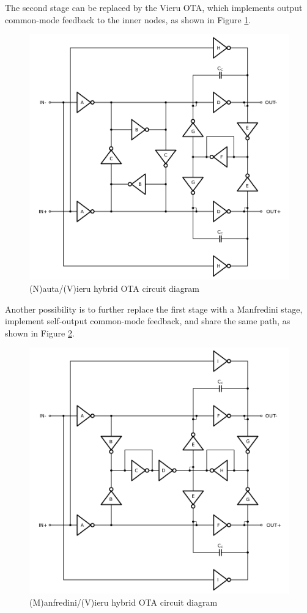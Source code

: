 \documentclass[conference]{IEEEtran}
\begin{document}
	The second stage can be replaced by the Vieru OTA, which implements output common-mode feedback to the inner nodes, as shown in Figure \ref{fig:nautavieru:sch}.
	
	\begin{figure}[!htbp]
		\centerline{\includegraphics[scale=0.50]{circuits/nautavieru.pdf}}
		\caption{(N)auta/(V)ieru hybrid OTA circuit diagram}
		\label{fig:nautavieru:sch}
	\end{figure}
	
	Another possibility is to further replace the first stage with a Manfredini stage, implement self-output common-mode feedback, and share the same path, as shown in Figure \ref{fig:manfvieru:sch}.
	
	\begin{figure}[!htbp]
		\centerline{\includegraphics[scale=0.50]{circuits/manfvieru.pdf}}
		\caption{(M)anfredini/(V)ieru hybrid OTA circuit diagram}	\label{fig:manfvieru:sch}
	\end{figure}
	
\end{document}
